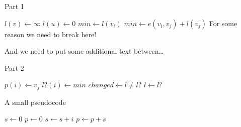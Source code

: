 \documentclass[letter,12pt]{article}
\begin{document}
\newpage





\begin{algorithm}
\caption{Part 1}
\begin{algorithmic}[1]
		\State $l(v) \leftarrow \infty$
	\EndFor
	\State $l(u) \leftarrow 0$
	\Repeat
			\State $min \leftarrow l(v_i)$
					\State $min \leftarrow e(v_i, v_j) + l(v_j)$
					\State \Comment For some reason we need to break here!
\end{algorithmic}
\end{algorithm}

And we need to put some additional text between\dots


\begin{algorithm}[h]
\caption{Part 2}
\begin{algorithmic}[1]
						\State $p(i) \leftarrow v_j$
					\EndIf
				\EndFor
			\State $l?(i) \leftarrow min$
		\EndFor
		\State $changed \leftarrow l \not= l?$
		\State $l \leftarrow l?$
\EndProcedure
\end{algorithmic}
\end{algorithm}




\begin{algorithm}
\caption{A small pseudocode}
\begin{algorithmic}[1]
\State $s \gets 0$
\State $p \gets 0$
	\State $s \gets s + i$
	\State $p \gets p + s$
\EndFor
\end{algorithmic}
\end{algorithm}

















%
%
%

{\linespread{1}


}
\end{document}
